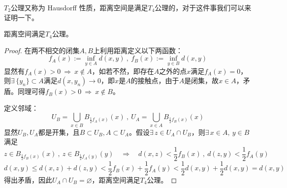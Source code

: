 $T_2$公理又称为 Hausdorff 性质，距离空间是满足$T_4$公理的，对于这件事我们可以来证明一下。
\begin{theorem}
    距离空间满足$T_4$公理。
\end{theorem}
\begin{proof}
在两不相交的闭集$A,B$上利用距离定义以下两函数：
\[f_A(x):=\mathop {\text{inf}}\limits_{y \in A}d(x,y) \ , \ f_B(x):=\mathop {\text{inf}}\limits_{y \in B}d(x,y)\]
显然有$f_A(x)>0 \ \Rightarrow \ x \notin A$，如若不然，即存在$A$之外的点$x$满足$f_A(x)=0$，则$\exists \, \{y_n\} \subset A $满足$d(x,y_n) \to 0$，即$x$是$A$的接触点，由于$A$是闭集，故$x \in A$，矛盾。同理可得$f_B(x)>0 \ \Rightarrow \ x \notin B$。

定义邻域：
\[U_B=\bigcup_{x \in B}B_{\frac{1}{2}f_A(x)}(x) \ , \ U_A=\bigcup_{x \in A}B_{\frac{1}{2}f_B(x)}(x)\]
显然$U_B,U_A$都是开集，且$B \subset U_B,A \subset U_A$。假设$\exists \, z \in U_A \cap U_B$，则$\exists \, x \in A, \ y \in B$满足
\[z \in B_{\frac{1}{2}f_B(x)}(x) \ , \ z \in B_{\frac{1}{2}f_A(y)}(y) \quad \Rightarrow \quad d(x,z)<\frac{1}{2}f_B(x) \ , \ d(z,y)<\frac{1}{2}f_A(y)\]
\[d(x,y) \leq d(x,z)+d(z,y)<\frac{1}{2}f_B(x)+\frac{1}{2}f_A(y)<\frac{1}{2}d(x,y)+\frac{1}{2}d(x,y)=d(x,y)\]
得出矛盾，因此$U_A \cap U_B=\varnothing$，距离空间满足$T_4$公理。
\end{proof}

